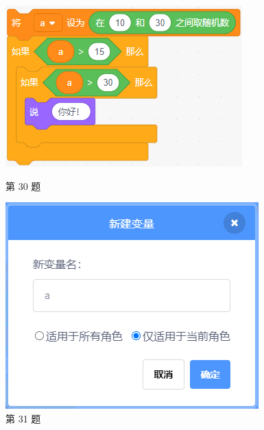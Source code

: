\documentclass[10pt, a4paper]{article}
\begin{document}
\begin{enumerate}
        \begin{figure}[htbp]
            \centering
            \begin{minipage}[t]{.25\textwidth}
                \centering
                \includegraphics[width=\textwidth]{figure/30.png}
                \caption*{第 30 题}
            \end{minipage}
            \begin{minipage}[t]{.2\textwidth}
                \centering
                \includegraphics[width=\textwidth]{figure/31.png}
                \caption*{第 31 题}
            \end{minipage}
            \begin{minipage}[t]{.13\textwidth}

\end{minipage}
\end{figure}
\end{enumerate}
\end{document}
